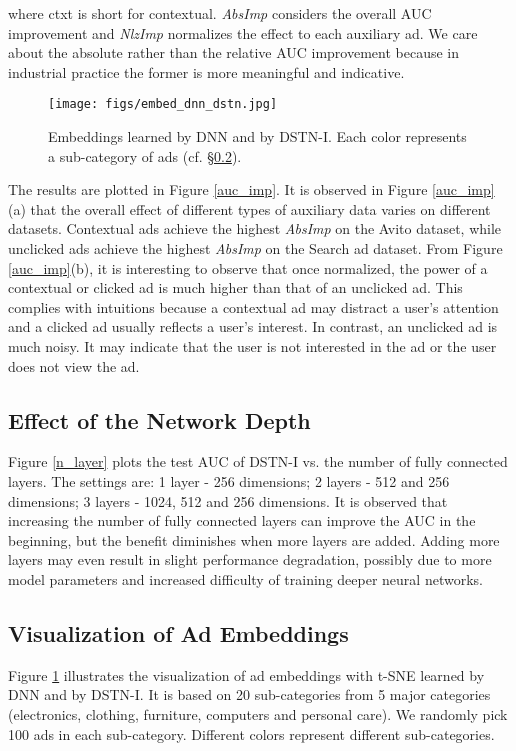 \documentclass[sigconf]{acmart}
\begin{document}
where ctxt is short for contextual.
\emph{AbsImp} considers the overall AUC improvement and \emph{NlzImp} normalizes the effect to each auxiliary ad.
We care about the absolute rather than the relative AUC improvement because in industrial practice the former is more meaningful and indicative.

\begin{figure}[!t]
\centering
\texttt{[image: figs/embed\_dnn\_dstn.jpg]}
\vskip -8pt
\caption{Embeddings learned by DNN and by DSTN-I. Each color represents a sub-category of ads (cf. \S\ref{sec_vis_emb}).}
\vskip -5pt
\label{embed_dstn}
\end{figure}

The results are plotted in Figure \ref{auc_imp}. It is observed in Figure \ref{auc_imp}(a) that the overall effect of different types of auxiliary data varies on different datasets. Contextual ads achieve the highest \emph{AbsImp} on the Avito dataset, while unclicked ads achieve the highest \emph{AbsImp} on the Search ad dataset.
From Figure \ref{auc_imp}(b), it is interesting to observe that once normalized, the power of a contextual or clicked ad is much higher than that of an unclicked ad. This complies with intuitions because a contextual ad may distract a user's attention and a clicked ad usually reflects a user's interest. In contrast, an unclicked ad is much noisy. It may indicate that the user is not interested in the ad or the user does not view the ad.

\subsection{Effect of the Network Depth}
Figure \ref{n_layer} plots the test AUC of DSTN-I vs. the number of fully connected layers. The settings are: 1 layer - 256 dimensions; 2 layers - 512 and 256 dimensions; 3 layers - 1024, 512 and 256 dimensions. It is observed that increasing the number of fully connected layers can improve the AUC in the beginning, but the benefit diminishes when more layers are added. Adding more layers may even result in slight performance degradation, possibly due to more model parameters and increased difficulty of training deeper neural networks.

\subsection{Visualization of Ad Embeddings} \label{sec_vis_emb}
Figure \ref{embed_dstn} illustrates the visualization of ad embeddings with t-SNE \cite{maaten2008visualizing} learned by DNN and by DSTN-I. It is based on 20 sub-categories from 5 major categories (electronics, clothing, furniture, computers and personal care). We randomly pick 100 ads in each sub-category. Different colors represent different sub-categories.
\end{document}
